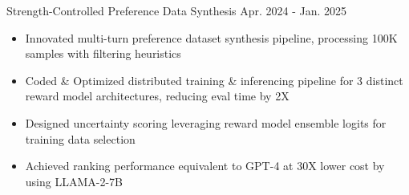 \cveventSameLine{}
    {Strength-Controlled Preference Data Synthesis}
    {Apr. 2024 - Jan. 2025}{}
\begin{itemize}

    \item Innovated multi-turn preference dataset synthesis pipeline, processing 100K samples with filtering heuristics


    \item Coded \& Optimized distributed training \& inferencing pipeline for 3 distinct reward model architectures, reducing eval time by 2X

    \item Designed uncertainty scoring leveraging reward model ensemble logits for training data selection

    \item Achieved ranking performance equivalent to GPT-4 at 30X lower cost by using LLAMA-2-7B
\end{itemize}
\dividerSmall


